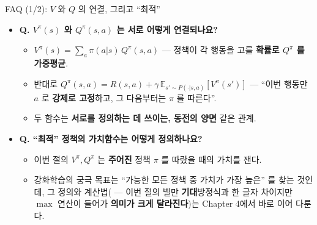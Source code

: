 \documentclass[aspectratio=169,11pt]{beamer}
\begin{document}
\begin{frame}{FAQ (1/2): $V$ 와 $Q$ 의 연결, 그리고 ``최적''}
  \begin{itemize}
    \item \textbf{Q. $V^\pi(s)$ 와 $Q^\pi(s,a)$ 는 서로 어떻게
      연결되나요?}
      \begin{itemize}
        \item $V^\pi(s) = \sum_a \pi(a|s)\,Q^\pi(s,a)$ --- 정책이
          각 행동을 고를 \textbf{확률로 $Q^\pi$ 를 가중평균}.
        \item 반대로 $Q^\pi(s,a) = R(s,a) + \gamma\,
          \mathbb{E}_{s'\sim P(\cdot|s,a)}[V^\pi(s')]$ --- ``이번
          행동만 $a$ 로 \textbf{강제로 고정}하고, 그 다음부터는
          $\pi$ 를 따른다''.
        \item 두 함수는 \textbf{서로를 정의하는 데 쓰이는, 동전의
          양면} 같은 관계.
      \end{itemize}
    \item \textbf{Q. ``최적'' 정책의 가치함수는 어떻게
      정의하나요?}
      \begin{itemize}
        \item 이번 절의 $V^\pi, Q^\pi$ 는 \textbf{주어진} 정책
          $\pi$ 를 따랐을 때의 가치를 잰다.
        \item 강화학습의 궁극 목표는 ``가능한 모든 정책 중 가치가
          가장 높은'' 를 찾는 것인데, 그
          정의와 계산법( ---
          이번 절의 벨만 \textbf{기대}방정식과 한 글자 차이지만
          $\max$ 연산이 들어가 \textbf{의미가 크게 달라진다})는
          Chapter 4에서 바로 이어 다룬다.
      \end{itemize}
  \end{itemize}
\end{frame}
\end{document}
